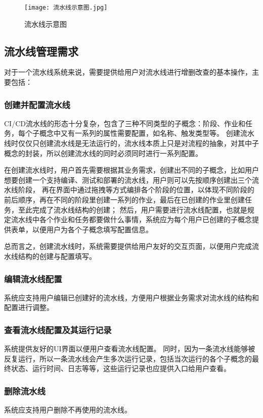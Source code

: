 \begin{figure}[h]
  \centering
  \texttt{[image: 流水线示意图.jpg]}
  \caption{流水线示意图}
  \label{fig:流水线示意图}
\end{figure}

\subsection{流水线管理需求}
对于一个流水线系统来说，需要提供给用户对流水线进行增删改查的基本操作，主要包括：

\subsubsection{创建并配置流水线}
CI/CD流水线的形态十分复杂，包含了三种不同类型的子概念：阶段、作业和任务，每个子概念中又有一系列的属性需要配置，如名称、触发类型等。
创建流水线时仅仅只创建流水线是无法运行的，流水线本质上只是对流程的抽象，对其中子概念的封装，所以创建流水线的同时必须同时进行一系列配置。

在创建流水线时，用户首先需要根据其业务需求，创建出不同的子概念，比如用户想要创建一个支持编译、测试和部署的流水线，用户则可以先按顺序创建出三个流水线阶段，
再在界面中通过拖拽等方式编排各个阶段的位置，以体现不同阶段的前后顺序，再在不同的阶段里创建一系列的作业，最后在已创建的作业里创建任务，至此完成了流水线结构的创建；
然后，用户需要进行流水线配置，也就是规定流水线中各个作业和任务都要做什么事情，系统应为每个用户已创建的子概念提供表单，以便用户为各个子概念填写配置信息。

总而言之，创建流水线时，系统需要提供给用户友好的交互页面，以便用户完成流水线结构的创建与配置填写。

\subsubsection{编辑流水线配置}

系统应支持用户编辑已创建好的流水线，方便用户根据业务需求对流水线的结构和配置进行调整。

\subsubsection{查看流水线配置及其运行记录}
系统提供友好的UI界面以便用户查看流水线配置。
同时，因为一条流水线能够被反复运行，所以一条流水线会产生多次运行记录，包括当次运行的各个子概念的最终状态、运行时间、日志等等，这些运行记录也应提供入口给用户查看。

\subsubsection{删除流水线}
系统应支持用户删除不再使用的流水线。

